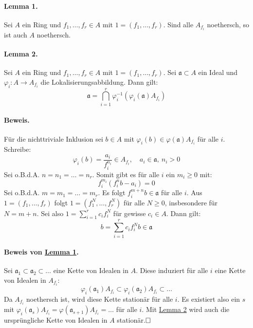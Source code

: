 \documentclass[11pt,b5paper,openany]{memoir}
\def \qed {$\hfill\square$}
\def \qedhere {\tag*{$\square$}}
\begin{document}
\paragraph{Lemma 1.}\label{3.6-lemma1} Sei $A$ ein Ring und $f_1,\ldots,f_r\in A$ mit $1=(f_1,\ldots,f_r)$. Sind alle $A_{f_i}$ noethersch, so ist auch $A$ noethersch.

\paragraph{Lemma 2.}\label{3.6-lemma2} Sei $A$ ein Ring und $f_1,\ldots,f_r\in A$ mit $1=(f_1,\ldots,f_r)$. Sei $\mathfrak{a}\subset A$ ein Ideal und $\varphi_i:A\to A_{f_i}$ die Lokalisierungsabbildung. Dann gilt:
\[\mathfrak{a} = \bigcap_{i=1}^r \varphi_i^{-1}(\varphi_i(\mathfrak{a}) A_{f_i}) \]

\paragraph{Beweis.} Für die nichttriviale Inklusion sei $b\in A$ mit $\varphi_i(b)\in \varphi(\mathfrak{a})A_{f_i}$ für alle $i$. Schreibe:
\[\varphi_i(b)=\frac{a_i}{f_i^{n_i}}\in A_{f_i},\quad a_i\in\mathfrak{a},\ n_i>0 \]
Sei o.B.d.A. $n=n_1=\ldots=n_r$. Somit gibt es für alle $i$ ein $m_i\geq 0$ mit:
\[f_i^{m_i}(f_i^nb-a_i)=0 \]
Sei o.B.d.A. $m=m_1=\ldots=m_r$. Es folgt $f_i^{m+n}b\in\mathfrak{a}$ für alle $i$. Aus $1=(f_1,\ldots,f_r)$ folgt $1=(f_1^N,\ldots,f_r^N)$ für alle $N\geq 0$, insbesondere für $N=m+n$. Sei also $1=\sum_{i=1}^rc_if_i^N$ für gewisse $c_i\in A$. Dann gilt:
\[b=\sum_{i=1}^rc_if_i^Nb\in\mathfrak{a}\qedhere \]

\paragraph{Beweis von \hyperref[3.6-lemma1]{Lemma 1}.} Sei $\mathfrak{a}_1\subset\mathfrak{a}_2\subset\ldots$ eine Kette von Idealen in $A$. Diese induziert für alle $i$ eine Kette von Idealen in $A_{f_i}$:
\[\varphi_i(\mathfrak{a}_1)A_{f_i}\subset\varphi_i(\mathfrak{a}_2) A_{f_i}\subset\ldots \]
Da $A_{f_i}$ noethersch ist, wird diese Kette stationär für alle $i$. Es existiert also ein $s$ mit $\varphi_i(\mathfrak{a}_s)A_{f_i}=\varphi(\mathfrak{a}_{s+1})A_{f_i}=\ldots$ für alle $i$. Mit \hyperref[3.6-lemma2]{Lemma 2} wird auch die ursprüngliche Kette von Idealen in $A$ stationär.\qed
\end{document}
